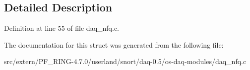 \subsection{Detailed Description}


Definition at line 55 of file daq\_\-nfq.c.



The documentation for this struct was generated from the following file:\begin{DoxyCompactItemize}
\item 
src/extern/PF\_\-RING-\/4.7.0/userland/snort/daq-\/0.5/os-\/daq-\/modules/daq\_\-nfq.c\end{DoxyCompactItemize}
